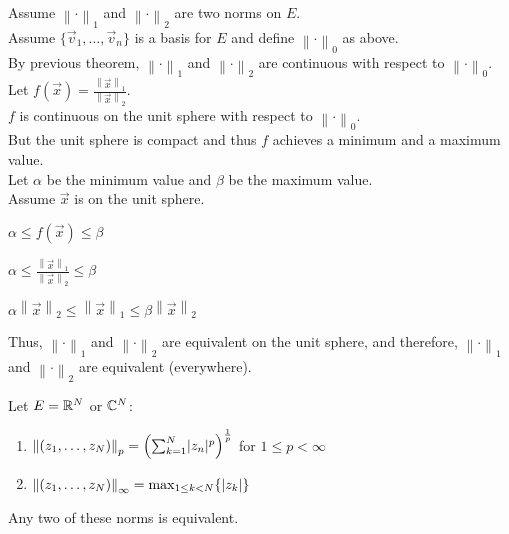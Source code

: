 \documentclass[letterpaper,12pt,fleqn]{article}
\newcommand{\nnorm}[2]{\left\|#1\right\|_{#2}}
\newcommand{\vv}{\vec{v}}
\newcommand{\vx}{\vec{x}}
\renewcommand{\a}{\alpha}
\renewcommand{\b}{\beta}
\begin{document}
\begin{theproof}
  Assume $\nnorm{\cdot}{1}$ and $\nnorm{\cdot}{2}$ are two norms on $E$. \\
  Assume $\{\vv_1,\ldots,\vv_n\}$ is a basis for $E$ and define
  $\nnorm{\cdot}{0}$ as above. \\
  By previous theorem, $\nnorm{\cdot}{1}$ and $\nnorm{\cdot}{2}$ are
  continuous with respect to $\nnorm{\cdot}{0}$. \\
  Let $f(\vx)=\frac{\nnorm{\vx}{1}}{\nnorm{\vx}{2}}$. \\
  $f$ is continuous on the unit sphere with respect to $\nnorm{\cdot}{0}$. \\
  But the unit sphere is compact and thus $f$ achieves a minimum and a
  maximum value. \\
  Let $\a$ be the minimum value and $\b$ be the maximum value. \\
  Assume $\vx$ is on the unit sphere.
  
  $\a\le f(\vx)\le\b$
  
  $\a\le\frac{\nnorm{\vx}{1}}{\nnorm{\vx}{2}}\le\b$
  
  $\a\nnorm{\vx}{2}\le\nnorm{\vx}{1}\le\b\nnorm{\vx}{2}$
  
  Thus, $\nnorm{\cdot}{1}$ and $\nnorm{\cdot}{2}$ are equivalent on the unit
  sphere, and therefore, $\nnorm{\cdot}{1}$ and $\nnorm{\cdot}{2}$ are
  equivalent (everywhere).
\end{theproof}

\begin{example}
  Let $E=\mathbb{R}^N$ or $\mathbb{C}^N$:
  \begin{enumerate}
  \item $\nnorm{(z_1,\ldots,z_N)}{p}=
    \left(\sum_{k=1}^N\abs{z_n}^p\right)^{\frac{1}{p}}$ for $1\le p<\infty$
  \item $\nnorm{(z_1,\ldots,z_N)}{\infty}=\max_{1\le k<N}\{\abs{z_k}\}$
  \end{enumerate}

  Any two of these norms is equivalent.
\end{example}
\end{document}
